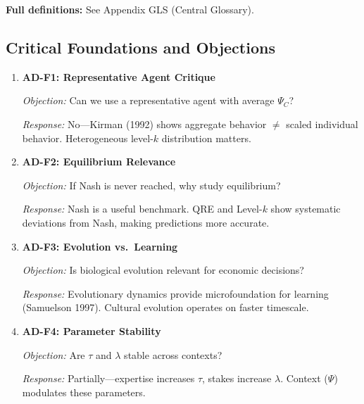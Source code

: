 \textbf{Full definitions:} See Appendix GLS (Central Glossary).

\subsection{Critical Foundations and Objections}
\label{sec:ad-foundations}


\begin{enumerate}
    \item \textbf{AD-F1: Representative Agent Critique}

    \textit{Objection:} Can we use a representative agent with average $\Psi_C$?

    \textit{Response:} No---Kirman (1992) shows aggregate behavior $\neq$ scaled
    individual behavior. Heterogeneous level-$k$ distribution matters.

    \item \textbf{AD-F2: Equilibrium Relevance}

    \textit{Objection:} If Nash is never reached, why study equilibrium?

    \textit{Response:} Nash is a useful benchmark. QRE and Level-$k$ show
    systematic deviations from Nash, making predictions more accurate.

    \item \textbf{AD-F3: Evolution vs.\ Learning}

    \textit{Objection:} Is biological evolution relevant for economic decisions?

    \textit{Response:} Evolutionary dynamics provide microfoundation for learning
    (Samuelson 1997). Cultural evolution operates on faster timescale.

    \item \textbf{AD-F4: Parameter Stability}

    \textit{Objection:} Are $\tau$ and $\lambda$ stable across contexts?

    \textit{Response:} Partially---expertise increases $\tau$, stakes increase
    $\lambda$. Context ($\Psi$) modulates these parameters.
\end{enumerate}

